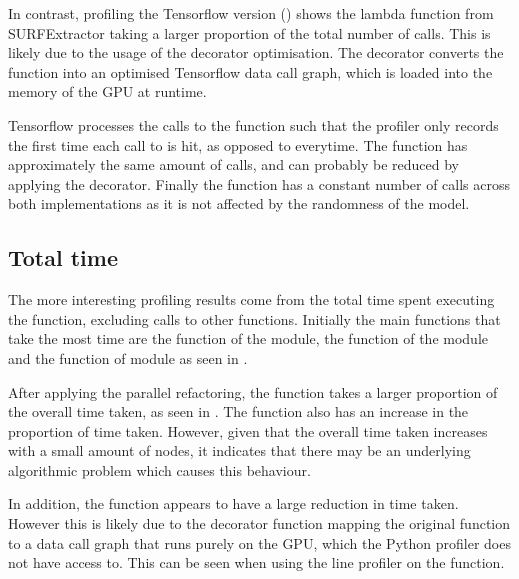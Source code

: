 In contrast, profiling the Tensorflow version () shows the lambda function from SURFExtractor taking a larger proportion of the total number of calls.
This is likely due to the usage of the  decorator optimisation.
The decorator converts the function into an optimised Tensorflow data call graph, which is loaded into the memory of the GPU at runtime.



Tensorflow processes the calls to the function such that the profiler only records the first time each call to  is hit, as opposed to everytime.
The  function has approximately the same amount of calls, and can probably be reduced by applying the  decorator.
Finally the  function has a constant number of calls across both implementations as it is not affected by the randomness of the model.


\subsection{Total time}

The more interesting profiling results come from the total time spent executing the function, excluding calls to other functions.
Initially the main functions that take the most time are the  function of the  module, the  function of the  module and the  function of  module as seen in .

After applying the parallel refactoring, the  function takes a larger proportion of the overall time taken, as seen in .
The  function also has an increase in the proportion of time taken.
However, given that the overall time taken increases with a small amount of nodes, it indicates that there may be an underlying algorithmic problem which causes this behaviour.




In addition, the  function appears to have a large reduction in time taken.
However this is likely due to the  decorator function mapping the original function to a data call graph that runs purely on the GPU, which the Python profiler does not have access to.
This can be seen when using the line profiler on the  function.

